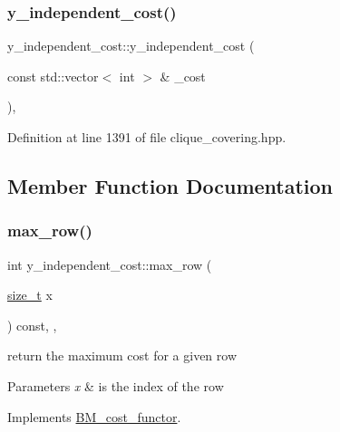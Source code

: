 \subsubsection{\texorpdfstring{y\+\_\+independent\+\_\+cost()}{y\_independent\_cost()}}
{\footnotesize\ttfamily y\+\_\+independent\+\_\+cost\+::y\+\_\+independent\+\_\+cost (\begin{DoxyParamCaption}\item[{const std\+::vector$<$ int $>$ \&}]{\+\_\+cost }\end{DoxyParamCaption})\hspace{0.3cm}{\ttfamily [inline]}, {\ttfamily [explicit]}}



Definition at line 1391 of file clique\+\_\+covering.\+hpp.



\subsection{Member Function Documentation}
\mbox{\label{structy__independent__cost_a9a70cf0455c1c8425279cfdcd04a6be6}} 
\subsubsection{\texorpdfstring{max\+\_\+row()}{max\_row()}}
{\footnotesize\ttfamily int y\+\_\+independent\+\_\+cost\+::max\+\_\+row (\begin{DoxyParamCaption}\item[{\hyperlink{tutorial__fpt__2017_2intro_2sixth_2test_8c_a7c94ea6f8948649f8d181ae55911eeaf}{size\+\_\+t}}]{x }\end{DoxyParamCaption}) const\hspace{0.3cm}{\ttfamily [inline]}, {\ttfamily [override]}, {\ttfamily [virtual]}}



return the maximum cost for a given row 


\begin{DoxyParams}{Parameters}
{\em x} & is the index of the row \\
\hline
\end{DoxyParams}


Implements \hyperlink{structBM__cost__functor_a40632938a246de559ee24def934ed08d}{B\+M\+\_\+cost\+\_\+functor}.



